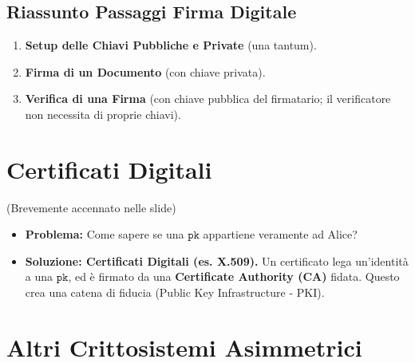 \subsection{Riassunto Passaggi Firma Digitale}
\begin{enumerate}
    \item \textbf{Setup delle Chiavi Pubbliche e Private} (una tantum).
    \item \textbf{Firma di un Documento} (con chiave privata).
    \item \textbf{Verifica di una Firma} (con chiave pubblica del firmatario; il verificatore non necessita di proprie chiavi).
\end{enumerate}

\section{Certificati Digitali}
(Brevemente accennato nelle slide)
\begin{itemize}
    \item \textbf{Problema:} Come sapere se una $\texttt{pk}$ appartiene veramente ad Alice?
    \item \textbf{Soluzione: Certificati Digitali (es. X.509).}
    Un certificato lega un'identità a una $\texttt{pk}$, ed è firmato da una \textbf{Certificate Authority (CA)} fidata.
    Questo crea una catena di fiducia (Public Key Infrastructure - PKI).
\end{itemize}

\section{Altri Crittosistemi Asimmetrici}

